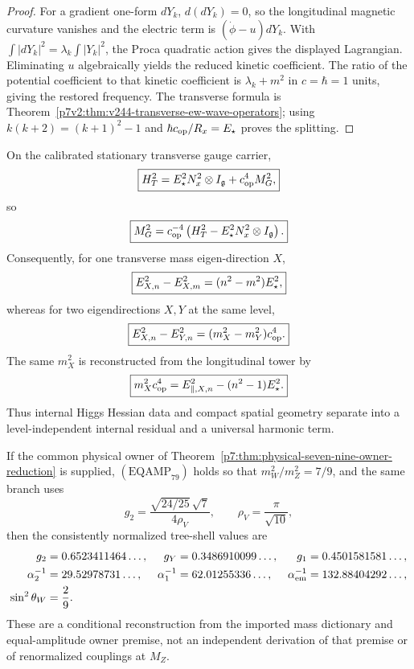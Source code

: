 \documentclass[12pt,a4paper]{article}
\begin{document}
\begin{proof}
For a gradient one-form \(dY_k\), \(d(dY_k)=0\), so the longitudinal magnetic
curvature vanishes and the electric term is
\((\dot\phi-u)dY_k\).  With
\(\int|dY_k|^2=\lambda_k\int|Y_k|^2\), the Proca quadratic action gives the
displayed Lagrangian.  Eliminating \(u\) algebraically yields the reduced
kinetic coefficient.  The ratio of the potential coefficient to that kinetic
coefficient is \(\lambda_k+m^2\) in \(c=\hbar=1\) units, giving the restored
frequency.  The transverse formula is
Theorem~\ref{p7v2:thm:v244-transverse-ew-wave-operators}; using
\(k(k+2)=(k+1)^2-1\) and
\(\hbar c_{\rm op}/R_x=E_\star\) proves the splitting.
\end{proof}

\begin{corollary}
\label{p7v2:cor:v247-gauge-mass-spectral-reconstruction}
On the calibrated stationary transverse gauge carrier,
\[
 \boxed{H_T^2
 =E_\star^2N_x^2\otimes I_{\mathfrak g}+c_{\rm op}^4M_G^2,}
\]
so
\[
 \boxed{M_G^2=c_{\rm op}^{-4}
 \left(H_T^2-E_\star^2N_x^2\otimes I_{\mathfrak g}\right).}
\]
Consequently, for one transverse mass eigen-direction \(X\),
\[
 \boxed{E_{X,n}^2-E_{X,m}^2=(n^2-m^2)E_\star^2,}
\]
whereas for two eigendirections \(X,Y\) at the same level,
\[
 \boxed{E_{X,n}^2-E_{Y,n}^2
 =(m_X^2-m_Y^2)c_{\rm op}^4.}
\]
The same \(m_X^2\) is reconstructed from the longitudinal tower by
\[
 \boxed{m_X^2c_{\rm op}^4
 =E_{\parallel,X,n}^2-(n^2-1)E_\star^2.}
\]
Thus internal Higgs Hessian data and compact spatial geometry separate into a
level-independent internal residual and a universal harmonic term.
\end{corollary}

\begin{corollary}
\label{p7v2:cor:tree-shell-numerics}
If the common physical owner of
Theorem~\ref{p7:thm:physical-seven-nine-owner-reduction} is supplied,
\((\mathrm{EQAMP}_{79})\) holds so that
\(m_W^2/m_Z^2=7/9\), and the same branch uses
\[
 g_2=\frac{\sqrt{24/25}\,\sqrt7}{4\rho_V},
 \qquad \rho_V=\frac{\pi}{\sqrt{10}},
\]
then the consistently normalized tree-shell values are
\begin{align}
\label{p7v2:eq:tree-shell-numerics}
 g_2&=0.6523411464\ldots,
 &
 g_Y&=0.3486910099\ldots,
 &
 g_1&=0.4501581581\ldots,\\
 \alpha_2^{-1}&=29.52978731\ldots,
 &
 \alpha_1^{-1}&=62.01255336\ldots,
 &
 \alpha_{\rm em}^{-1}&=132.88404292\ldots,\\
 \sin^2\theta_W&=\frac29.
\end{align}
These are a conditional reconstruction from the imported mass dictionary and
equal-amplitude owner premise, not an independent derivation of that premise
or of renormalized couplings at \(M_Z\).
\end{corollary}
\end{document}
